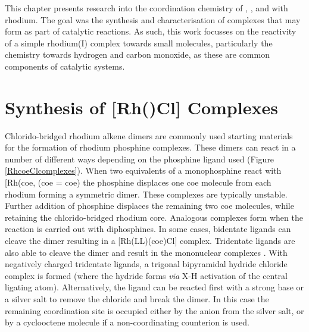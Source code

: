 This chapter presents research into the coordination chemistry of \tBusixantphos, \tButhixantphos, and \tBuxantphos{} with rhodium.  The goal was the synthesis and characterisation of complexes that may form as part of catalytic reactions.  As such, this work focusses on the reactivity of a simple rhodium(I) complex towards small molecules, particularly the chemistry towards hydrogen and carbon monoxide, as these are common components of catalytic systems.  

\section{Synthesis of [Rh(\POP)Cl] Complexes}
\label{section:rhodiumchloride}

Chlorido-bridged rhodium alkene dimers are commonly used starting materials for the formation of rhodium phosphine complexes.  These dimers can react in a number of different ways depending on the phosphine ligand used (Figure \ref{RhcoeClcomplexes}).  When two equivalents of a monophosphine react with [Rh(\acrshort{coe}\ce{)2Cl]2}, (\acrshort{coe} = \acrlong{coe}) the phosphine displaces one \acrshort{coe} molecule from each rhodium forming a symmetric dimer.\cite{Canepa2003}  These complexes are typically unstable.  Further addition of phosphine displaces the remaining two \acrshort{coe} molecules, while retaining the chlorido-bridged rhodium core.\cite{Bleeke1986}  Analogous complexes form when the reaction is carried out with diphosphines.\cite{Fryzuk1989}  In some cases, bidentate ligands can cleave the dimer resulting in a [Rh(LL)(\acrshort{coe})Cl] complex.\cite{Hashimoto2010}  Tridentate ligands are also able to cleave the dimer and result in the mononuclear complexes \ce{[Rh(LLL)Cl]}\cite{Khan1988, Hermann2002}.  With negatively charged tridentate ligands, a trigonal bipyramidal hydride chloride complex is formed (where the hydride forms \emph{via} X-H activation of the central ligating atom).\cite{Boom1998, Winter2003, Salem2008}  Alternatively, the ligand can be reacted first with a strong base or a silver salt to remove the chloride and break the dimer.  In this case the remaining coordination site is occupied either by the anion from the silver salt, or by a cyclooctene molecule if a non-coordinating counterion is used.\cite{Fryzuk1986, Hanson2008}

